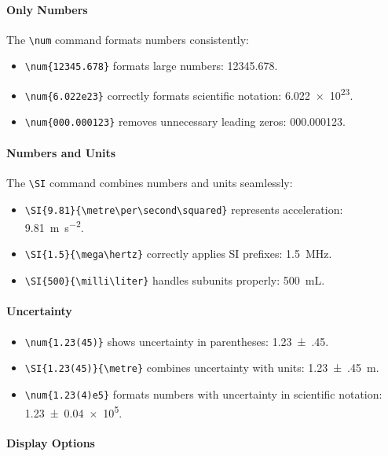 \paragraph*{Only Numbers}

The \verb|\num| command formats numbers consistently:
\begin{itemize}
    \item \verb|\num{12345.678}| formats large numbers: \num{12345.678}.
    \item \verb|\num{6.022e23}| correctly formats scientific notation: \num{6.022e23}.
    \item \verb|\num{000.000123}| removes unnecessary leading zeros: \num{000.000123}.
\end{itemize}

\paragraph*{Numbers and Units}

The \verb|\SI| command combines numbers and units seamlessly:
\begin{itemize}
    \item \verb|\SI{9.81}{\metre\per\second\squared}| represents acceleration: \SI{9.81}{\metre\per\second\squared}.
    \item \verb|\SI{1.5}{\mega\hertz}| correctly applies SI prefixes: \SI{1.5}{\mega\hertz}.
    \item \verb|\SI{500}{\milli\liter}| handles subunits properly: \SI{500}{\milli\liter}.
\end{itemize}

\paragraph*{Uncertainty}

\begin{itemize}
    \item \verb|\num{1.23(45)}| shows uncertainty in parentheses: \num{1.23(45)}.
    \item \verb|\SI{1.23(45)}{\metre}| combines uncertainty with units: \SI{1.23(45)}{\metre}.
    \item \verb|\num{1.23(4)e5}| formats numbers with uncertainty in scientific notation: \num{1.23(4)e5}.
\end{itemize}

\paragraph*{Display Options}


